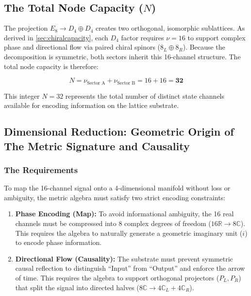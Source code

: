 \subsection{The Total Node Capacity (\texorpdfstring{$N$}{N})}
\label{sec:total_node_capacity}
The projection $E_8 \to D_4 \oplus D_4$ creates two orthogonal, isomorphic sublattices. As derived in \cref{sec:chiralcapacity}, each $D_4$ factor requires $\nu=16$ to support complex phase and directional flow via paired chiral spinors ($8_L \oplus 8_R$). Because the decomposition is symmetric, both sectors inherit this 16-channel structure. The total node capacity is therefore:

\begin{equation}
    N = \nu_{\text{Sector A}} + \nu_{\text{Sector B}} = 16 + 16 = \mathbf{32}
\end{equation}

This integer $N = 32$ represents the total number of distinct state channels available for encoding information on the lattice substrate.


\subsection{Dimensional Reduction: Geometric Origin of The Metric Signature and Causality}
\label{sec:metric_signature}

\subsubsection{The Requirements}
To map the 16-channel signal onto a 4-dimensional manifold without loss or ambiguity, the metric algebra must satisfy two strict encoding constraints:
\begin{enumerate}
    \item \textbf{Phase Encoding (Map):} To avoid informational ambiguity, the 16 real channels must be compressed into 8 complex degrees of freedom ($16\mathbb{R} \to 8\mathbb{C}$). This requires the algebra to naturally generate a geometric imaginary unit ($i$) to encode phase information.
    \item \textbf{Directional Flow (Causality):} The substrate must prevent symmetric causal reflection to distinguish ``Input'' from ``Output'' and enforce the arrow of time. This requires the algebra to support orthogonal projectors ($P_L, P_R$) that split the signal into directed halves ($8\mathbb{C} \to 4\mathbb{C}_L + 4\mathbb{C}_R$).
\end{enumerate}

